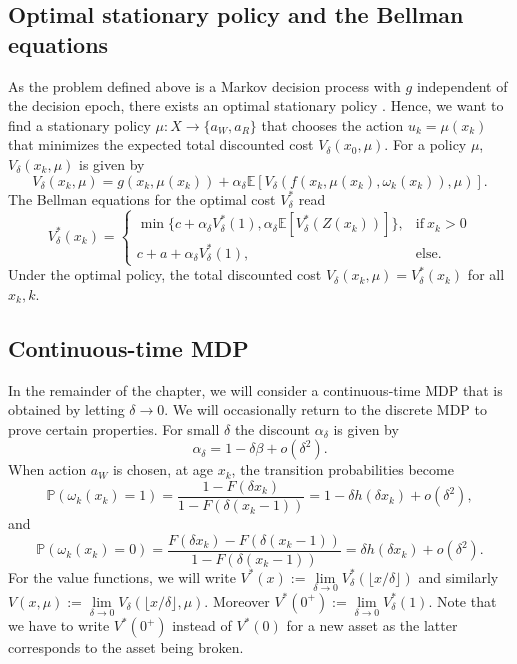 \subsection{Optimal stationary policy and the Bellman equations}
As the problem defined above is a Markov decision process with $g$ independent of the decision epoch, there exists an optimal stationary policy \cite{Puterman2008}.
Hence, we want to find a stationary policy $\mu:X\rightarrow \{a_W,a_R\}$ that chooses the action $u_k=\mu(x_k)$ that minimizes the expected total discounted cost $V_\delta(x_0,\mu)$.
For a policy $\mu$, $V_\delta(x_k,\mu)$ is given by
$$
V_\delta(x_k,\mu)=g(x_k,\mu(x_k))+\alpha_\delta \mathbb{E}[V_\delta(f(x_k,\mu(x_k),\omega_k(x_k)),\mu)].
$$
The Bellman equations for the optimal cost $V^*_\delta$ read
\begin{equation}\label{eq:AgeBasedBellman}
V^*_\delta(x_k)=\begin{cases}
\min\{c+\alpha_\delta V^*_\delta(1),\alpha_\delta \mathbb{E}[V^*_\delta(Z(x_k))]\},&\text{if}\ x_k>0 \\
c+a+\alpha_\delta V^*_\delta(1),&\text{else.}
\end{cases}
\end{equation}
Under the optimal policy, the total discounted cost $V_\delta(x_k,\mu)=V^*_\delta(x_k)$ for all $x_k,k$.

\subsection{Continuous-time MDP}
In the remainder of the chapter, we will consider a continuous-time MDP that is obtained by letting $\delta\rightarrow0$.
We will occasionally return to the discrete MDP to prove certain properties.
For small $\delta$ the discount $\alpha_\delta$ is given by
\[
\alpha_\delta=1-\delta\beta+o(\delta^2).
\]
When action $a_W$ is chosen, at age $x_k$, the transition probabilities become
$$
\mathbb{P}(\omega_k(x_k)=1)=\frac{1-F(\delta x_k)}{1-F(\delta (x_k-1))}=1-\delta h(\delta x_k)+o(\delta^2),
$$
and
\[
\mathbb{P}(\omega_k(x_k)=0)=\frac{F(\delta x_k)-F(\delta (x_k-1))}{1-F(\delta (x_k-1))}=\delta h(\delta x_k)+o(\delta^2).
\]
For the value functions, we will write $V^*(x):=\lim\limits_{\delta\rightarrow0}V_\delta^*(\lfloor x/\delta\rfloor)$ and similarly $V(x,\mu):=\lim\limits_{\delta\rightarrow0}V_\delta(\lfloor x/\delta\rfloor,\mu)$.
Moreover $V^*(0^+):=\lim\limits_{\delta\rightarrow0}V_\delta^*(1)$.
Note that we have to write $V^*(0^+)$ instead of $V^*(0)$ for a new asset as the latter corresponds to the asset being broken.

